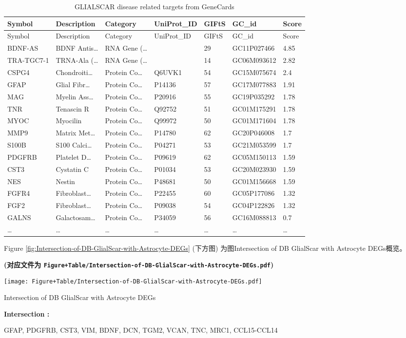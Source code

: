 \documentclass[
]{article}
\begin{document}
\begin{longtable}[]{@{}lllllll@{}}
\caption{\label{tab:GLIALSCAR-disease-related-targets-from-GeneCards}GLIALSCAR disease related targets from GeneCards}\tabularnewline
\toprule
Symbol & Description & Category & UniProt\_ID & GIFtS & GC\_id & Score\tabularnewline
\midrule
\endfirsthead
\toprule
Symbol & Description & Category & UniProt\_ID & GIFtS & GC\_id & Score\tabularnewline
\midrule
\endhead
BDNF-AS & BDNF Antis\ldots{} & RNA Gene (\ldots{} & & 29 & GC11P027466 & 4.85\tabularnewline
TRA-TGC7-1 & TRNA-Ala (\ldots{} & RNA Gene (\ldots{} & & 14 & GC06M093612 & 2.82\tabularnewline
CSPG4 & Chondroiti\ldots{} & Protein Co\ldots{} & Q6UVK1 & 54 & GC15M075674 & 2.4\tabularnewline
GFAP & Glial Fibr\ldots{} & Protein Co\ldots{} & P14136 & 57 & GC17M077883 & 1.91\tabularnewline
MAG & Myelin Ass\ldots{} & Protein Co\ldots{} & P20916 & 55 & GC19P035292 & 1.78\tabularnewline
TNR & Tenascin R & Protein Co\ldots{} & Q92752 & 51 & GC01M175291 & 1.78\tabularnewline
MYOC & Myocilin & Protein Co\ldots{} & Q99972 & 50 & GC01M171604 & 1.78\tabularnewline
MMP9 & Matrix Met\ldots{} & Protein Co\ldots{} & P14780 & 62 & GC20P046008 & 1.7\tabularnewline
S100B & S100 Calci\ldots{} & Protein Co\ldots{} & P04271 & 53 & GC21M053599 & 1.7\tabularnewline
PDGFRB & Platelet D\ldots{} & Protein Co\ldots{} & P09619 & 62 & GC05M150113 & 1.59\tabularnewline
CST3 & Cystatin C & Protein Co\ldots{} & P01034 & 53 & GC20M023930 & 1.59\tabularnewline
NES & Nestin & Protein Co\ldots{} & P48681 & 50 & GC01M156668 & 1.59\tabularnewline
FGFR4 & Fibroblast\ldots{} & Protein Co\ldots{} & P22455 & 60 & GC05P177086 & 1.32\tabularnewline
FGF2 & Fibroblast\ldots{} & Protein Co\ldots{} & P09038 & 54 & GC04P122826 & 1.32\tabularnewline
GALNS & Galactosam\ldots{} & Protein Co\ldots{} & P34059 & 56 & GC16M088813 & 0.7\tabularnewline
\ldots{} & \ldots{} & \ldots{} & \ldots{} & \ldots{} & \ldots{} & \ldots{}\tabularnewline
\bottomrule
\end{longtable}

Figure \ref{fig:Intersection-of-DB-GlialScar-with-Astrocyte-DEGs} (下方图) 为图Intersection of DB GlialScar with Astrocyte DEGs概览。

\textbf{(对应文件为 \texttt{Figure+Table/Intersection-of-DB-GlialScar-with-Astrocyte-DEGs.pdf})}

\def\@captype{figure}
\begin{center}
\texttt{[image: Figure+Table/Intersection-of-DB-GlialScar-with-Astrocyte-DEGs.pdf]}
\caption{Intersection of DB GlialScar with Astrocyte DEGs}\label{fig:Intersection-of-DB-GlialScar-with-Astrocyte-DEGs}
\end{center}
\begin{center}\begin{tcolorbox}[colback=gray!10, colframe=gray!50, width=0.9\linewidth, arc=1mm, boxrule=0.5pt]
\textbf{
Intersection
:}

\vspace{0.5em}

    GFAP, PDGFRB, CST3, VIM, BDNF, DCN, TGM2, VCAN, TNC,
MRC1, CCL15-CCL14

\vspace{2em}
\end{tcolorbox}
\end{center}
\end{document}
